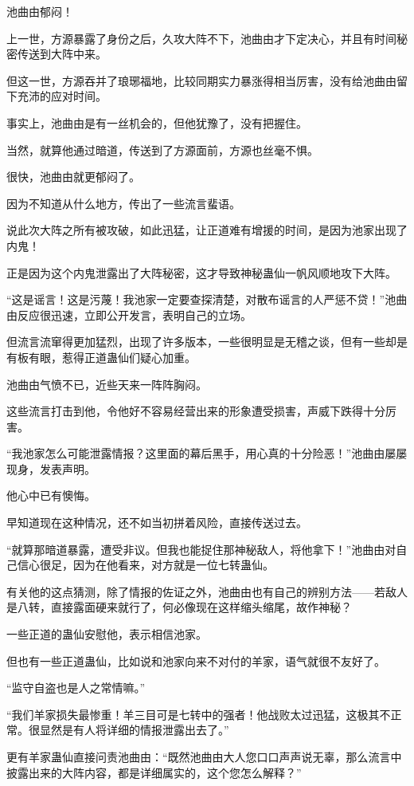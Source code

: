\begin{this_body}
池曲由郁闷！

上一世，方源暴露了身份之后，久攻大阵不下，池曲由才下定决心，并且有时间秘密传送到大阵中来。

但这一世，方源吞并了琅琊福地，比较同期实力暴涨得相当厉害，没有给池曲由留下充沛的应对时间。

事实上，池曲由是有一丝机会的，但他犹豫了，没有把握住。

当然，就算他通过暗道，传送到了方源面前，方源也丝毫不惧。

很快，池曲由就更郁闷了。

因为不知道从什么地方，传出了一些流言蜚语。

说此次大阵之所有被攻破，如此迅猛，让正道难有增援的时间，是因为池家出现了内鬼！

正是因为这个内鬼泄露出了大阵秘密，这才导致神秘蛊仙一帆风顺地攻下大阵。

“这是谣言！这是污蔑！我池家一定要查探清楚，对散布谣言的人严惩不贷！”池曲由反应很迅速，立即公开发言，表明自己的立场。

但流言流窜得更加猛烈，出现了许多版本，一些很明显是无稽之谈，但有一些却是有板有眼，惹得正道蛊仙们疑心加重。

池曲由气愤不已，近些天来一阵阵胸闷。

这些流言打击到他，令他好不容易经营出来的形象遭受损害，声威下跌得十分厉害。

“我池家怎么可能泄露情报？这里面的幕后黑手，用心真的十分险恶！”池曲由屡屡现身，发表声明。

他心中已有懊悔。

早知道现在这种情况，还不如当初拼着风险，直接传送过去。

“就算那暗道暴露，遭受非议。但我也能捉住那神秘敌人，将他拿下！”池曲由对自己信心很足，因为在他看来，对方就是一位七转蛊仙。

有关他的这点猜测，除了情报的佐证之外，池曲由也有自己的辨别方法——若敌人是八转，直接露面硬来就行了，何必像现在这样缩头缩尾，故作神秘？

一些正道的蛊仙安慰他，表示相信池家。

但也有一些正道蛊仙，比如说和池家向来不对付的羊家，语气就很不友好了。

“监守自盗也是人之常情嘛。”

“我们羊家损失最惨重！羊三目可是七转中的强者！他战败太过迅猛，这极其不正常。很显然是有人将详细的情报泄露出去了。”

更有羊家蛊仙直接问责池曲由：“既然池曲由大人您口口声声说无辜，那么流言中披露出来的大阵内容，都是详细属实的，这个您怎么解释？”


\end{this_body}
